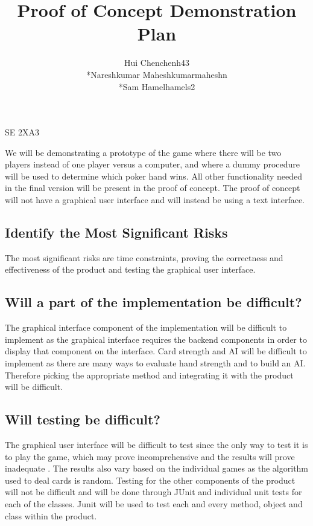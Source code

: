 \documentclass[11pt]{article}
\begin{document}
    \begin{titlepage}
    \title {Proof of Concept Demonstration                     Plan}
    \maketitle
        \begin{center}
		SE 2XA3\\
		\author{
		Hui Chen\hspace{128pt}chenh43	
		\\*Nareshkumar Maheshkumar\hspace{35pt}maheshn 
		\\*Sam Hamel\hspace{118pt}hamels2 \\
		}
		\end{center}
    \end{titlepage}
    
    \newpage
      We will be demonstrating a prototype of the game where there will be two players instead of one player  versus a computer, and where a dummy procedure will be used to determine which poker hand wins. All other functionality needed in the final version will be present in the proof of concept. The proof of concept will not have a graphical user interface and will instead be using a text interface. 
 	\subsection*{Identify the Most Significant Risks}
    The most significant risks are time constraints, proving the correctness and effectiveness of the product and testing the graphical user interface.
    \subsection*{Will a part of the implementation be difficult?}
	The graphical interface component of the implementation will be difficult to implement as the graphical interface requires the backend components in order to display that component on the interface. Card strength and AI will be difficult to implement as there are many ways to evaluate hand strength and to build an AI. Therefore picking the appropriate method and integrating it with the product will be difficult. 

    \subsection*{Will testing be difficult?}
    The graphical user interface will be difficult to test since the only way to test it is to play the game, which may prove incomprehensive and the results will prove inadequate . The results also vary based on the individual games as the algorithm used to deal cards is random. Testing for the other components of the product will not be difficult and will be done through JUnit and individual unit tests for each of the classes. Junit will be used to test each and every method, object and class within the product. 
\end{document}
